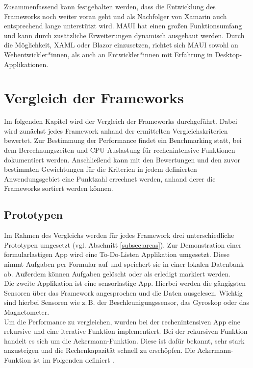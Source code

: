 \documentclass[]{lni}
\begin{document}
Zusammenfassend kann festgehalten werden, dass die Entwicklung des Frameworks noch weiter voran geht und als Nachfolger von Xamarin auch entsprechend lange unterstützt wird. MAUI hat einen großen Funktionsumfang und kann durch zusätzliche Erweiterungen dynamisch ausgebaut werden. Durch die Möglichkeit, XAML oder Blazor einzusetzen, richtet sich MAUI sowohl an Webentwickler*innen, als auch an Entwickler*innen mit Erfahrung in Desktop-Applikationen.

\clearpage

\section{Vergleich der Frameworks}\label{sec:compare}
Im folgenden Kapitel wird der Vergleich der Frameworks durchgeführt. Dabei wird zunächst jedes Framework anhand der ermittelten Vergleichskriterien bewertet. Zur Bestimmung der Performance findet ein Benchmarking statt, bei dem Berechnungszeiten und CPU-Auslastung für rechenintensive Funktionen dokumentiert werden. Anschließend kann mit den Bewertungen und den zuvor bestimmten Gewichtungen für die Kriterien in jedem definierten Anwendungsgebiet eine Punktzahl errechnet werden, anhand derer die Frameworks sortiert werden können.

\subsection{Prototypen} \label{sec:prototypen}
Im Rahmen des Vergleichs werden für jedes Framework drei unterschiedliche Prototypen umgesetzt (vgl. Abschnitt \ref{subsec:areas}). Zur Demonstration einer formularlastigen App wird eine To-Do-Listen Applikation umgesetzt. Diese nimmt Aufgaben per Formular auf und speichert sie in einer lokalen Datenbank ab. Außerdem können Aufgaben gelöscht oder als \glqq{}erledigt\grqq{} markiert werden.\\
Die zweite Applikation ist eine sensorlastige App. Hierbei werden die gängigsten Sensoren über das Framework angesprochen und die Daten ausgelesen. Wichtig sind hierbei Sensoren wie z.\,B. der Beschleunigungssensor, das Gyroskop oder das Magnetometer.\\
Um die Performance zu vergleichen, wurden bei der rechenintensiven App eine rekursive und eine iterative Funktion implementiert. Bei der rekursiven Funktion handelt es sich um die Ackermann-Funktion. Diese ist dafür bekannt, sehr stark anzusteigen und die Rechenkapazität schnell zu erschöpfen. Die Ackermann-Funktion ist im Folgenden definiert \cite{Tutego.10.02.2015}.
\end{document}
